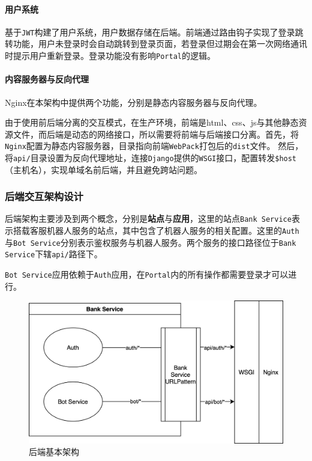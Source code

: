 \documentclass[hyperref]{ctexart}
\begin{document}
\paragraph{用户系统}
基于\texttt{JWT}构建了用户系统，用户数据存储在后端。前端通过路由钩子实现了登录跳转功能，用户未登录时会自动跳转到登录页面，若登录但过期会在第一次网络通讯时提示用户重新登录。登录功能没有影响\texttt{Portal}的逻辑。
\paragraph{内容服务器与反向代理}
Nginx在本架构中提供两个功能，分别是静态内容服务器与反向代理。
\par 由于使用前后端分离的交互模式，在生产环境，前端是html、css、js与其他静态资源文件，而后端是动态的网络接口，所以需要将前端与后端接口分离。首先，将\texttt{Nginx}配置为静态内容服务器，目录指向前端\texttt{WebPack}打包后的\texttt{dist}文件。
然后，将\texttt{api/}目录设置为反向代理地址，连接\texttt{Django}提供的\texttt{WSGI}接口，配置转发\texttt{\$host}（主机名），实现单域名前后端，并且避免跨站问题。
\subsubsection{后端交互架构设计}
后端架构主要涉及到两个概念，分别是{\bf 站点}与{\bf 应用}，这里的站点\texttt{Bank Service}表示搭载客服机器人服务的站点，其中包含了机器人服务的相关配置。这里的\texttt{Auth}与\texttt{Bot Service}分别表示鉴权服务与机器人服务。两个服务的接口路径位于\texttt{Bank Service}下辖\texttt{api/}路径下。
\par \texttt{Bot Service}应用依赖于\texttt{Auth}应用，在\texttt{Portal}内的所有操作都需要登录才可以进行。
\begin{figure}[H]
    \centering
    \includegraphics[scale=0.13]{figure/3.png}
    \caption{后端基本架构}
    \label{Fig.1.3}
\end{figure}
\end{document}
